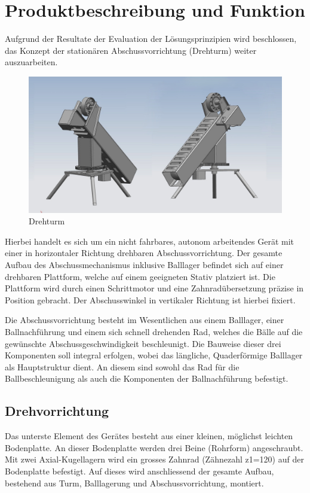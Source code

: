 \section{Produktbeschreibung und Funktion}

Aufgrund der Resultate der Evaluation der Lösungsprinzipien wird beschlossen, 
das Konzept der stationären Abschussvorrichtung (Drehturm) weiter 
auszuarbeiten. 
\begin{figure}[h!]          
	\centering             
	\includegraphics[width=1.0\textwidth]{fig/Gesamt_bg.jpg}    
	\caption{Drehturm}
	\label{fig:bild} 
\end{figure}

Hierbei handelt es sich um ein nicht fahrbares, autonom arbeitendes Gerät mit 
einer in horizontaler Richtung drehbaren Abschussvorrichtung. Der gesamte Aufbau 
des Abschussmechanismus inklusive Balllager befindet sich auf einer drehbaren 
Plattform, welche auf einem geeigneten Stativ platziert ist. Die Plattform 
wird durch einen Schrittmotor und eine Zahnradübersetzung präzise in Position 
gebracht. Der Abschusswinkel in vertikaler Richtung ist hierbei fixiert. 

Die Abschussvorrichtung besteht im Wesentlichen aus einem Balllager, einer 
Ballnachführung und einem sich schnell drehenden Rad, welches die Bälle auf 
die gewünschte Abschussgeschwindigkeit beschleunigt. Die Bauweise dieser drei 
Komponenten soll integral erfolgen, wobei das längliche, Quaderförmige 
Balllager als Hauptstruktur dient. An diesem sind sowohl das Rad für die 
Ballbeschleunigung als auch die Komponenten der Ballnachführung befestigt.

\subsection{Drehvorrichtung}
Das unterste Element des Gerätes besteht aus einer kleinen, möglichst leichten 
Bodenplatte. An dieser Bodenplatte werden drei Beine (Rohrform) angeschraubt. Mit 
zwei Axial-Kugellagern wird ein grosses Zahnrad (Zähnezahl z1=120) auf der Bodenplatte 
befestigt. Auf dieses wird anschliessend der gesamte Aufbau, bestehend aus 
Turm, Balllagerung und Abschussvorrichtung, montiert. 

